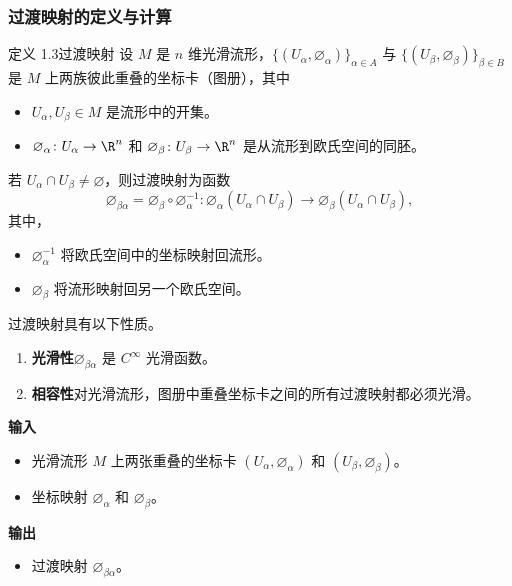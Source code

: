 \subsubsection{过渡映射的定义与计算}
\begin{statement}{定义 1.3}{过渡映射}
设 $M$ 是 $n$ 维光滑流形，$\{(U_\alpha,\varnothing_\alpha)\}_{\alpha\in A}$ 与
$\{(U_\beta,\varnothing_\beta)\}_{\beta\in B}$ 是 $M$ 上两族彼此重叠的坐标卡（图册），其中
\begin{itemize}
  \item $U_\alpha,U_\beta\in M$ 是流形中的开集。
  \item $\varnothing_\alpha\colon U_\alpha\to\R^n$ 和 $\varnothing_\beta\colon U_\beta\to\R^n$ 是从流形到欧氏空间的同胚。
\end{itemize}
\end{statement}

若 $U_\alpha\cap U_\beta\ne\varnothing$，则过渡映射为函数
\[
  \varnothing_{\beta\alpha}
  =\varnothing_\beta\circ\varnothing_\alpha^{-1}\colon
  \varnothing_\alpha(U_\alpha\cap U_\beta)
  \longrightarrow \varnothing_\beta(U_\alpha\cap U_\beta),
\]
其中，
\begin{itemize}
  \item $\varnothing_\alpha^{-1}$ 将欧氏空间中的坐标映射回流形。
  \item $\varnothing_\beta$ 将流形映射回另一个欧氏空间。
\end{itemize}
过渡映射具有以下性质。
\begin{enumerate}
  \item \textbf{光滑性}\quad $\varnothing_{\beta\alpha}$ 是 $C^\infty$ 光滑函数。
  \item \textbf{相容性}\quad 对光滑流形，图册中重叠坐标卡之间的所有过渡映射都必须光滑。
\end{enumerate}

\textbf{输入}
\begin{itemize}
  \item 光滑流形 $M$ 上两张重叠的坐标卡 $(U_\alpha,\varnothing_\alpha)$ 和 $(U_\beta,\varnothing_\beta)$。
  \item 坐标映射 $\varnothing_\alpha$ 和 $\varnothing_\beta$。
\end{itemize}
\textbf{输出}
\begin{itemize}
  \item 过渡映射 $\varnothing_{\beta\alpha}$。
\end{itemize}


